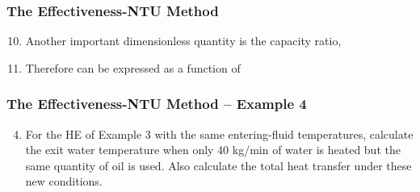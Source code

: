 \documentclass[10pt,compress,unknownkeysallowed]{beamer}
\begin{document}
\begin{frame}
  \frametitle{The Effectiveness-NTU Method}
     \begin{enumerate}\setcounter{enumi}{9}
          \item<1-> Another important dimensionless quantity is the capacity ratio,
          \item<2-> Therefore  can be expressed as a function of
         
     \end{enumerate}

\end{frame}

\begin{frame}
  \frametitle{ The Effectiveness-NTU Method -- Example 4}
      \begin{enumerate}\setcounter{enumi}{3}
         \item For the HE of Example 3 with the same entering-fluid temperatures, calculate the exit water temperature when only 40 kg/min of water is heated but the same quantity of oil is used. Also calculate the total heat transfer under these new conditions.
      \end{enumerate}
\end{frame}
\end{document}
